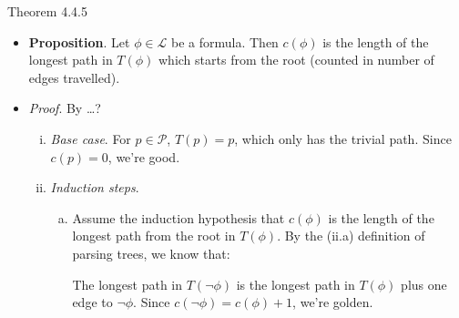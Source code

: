 \documentclass[../slides.tex]{subfiles}
\begin{document}
\begin{frame}{Theorem 4.4.5}

	\begin{itemize}
	
		\item \textbf{Proposition}. Let $\phi\in\mathcal{L}$ be a formula. Then $c(\phi)$ is the length of the longest path in $T(\phi)$ which starts from the root (counted in number of edges travelled).
		
		\item \emph{Proof}. By \dots ?
		
		\begin{enumerate}[(i)]
		
			\item \emph{Base case}. For $p\in\mathcal{P}$, $T(p)=p$, which only has the trivial path. Since $c(p)=0$, we're good.
			
			\item \emph{Induction steps}. 
				\begin{enumerate}[(a)]

					\item Assume the induction hypothesis that $c(\phi)$ is the length of the longest path from the root in $T(\phi)$. By the (ii.a) definition of parsing trees, we know that:
					\begin{center}
\end{center}
The longest path in $T(\neg\phi)$ is the longest path in $T(\phi)$ plus one edge to $\neg\phi$. Since $c(\neg\phi)=c(\phi)+1$, we're golden.
		
		\end{enumerate}
		
		\end{enumerate}
	
	\end{itemize}

\end{frame}
\end{document}
